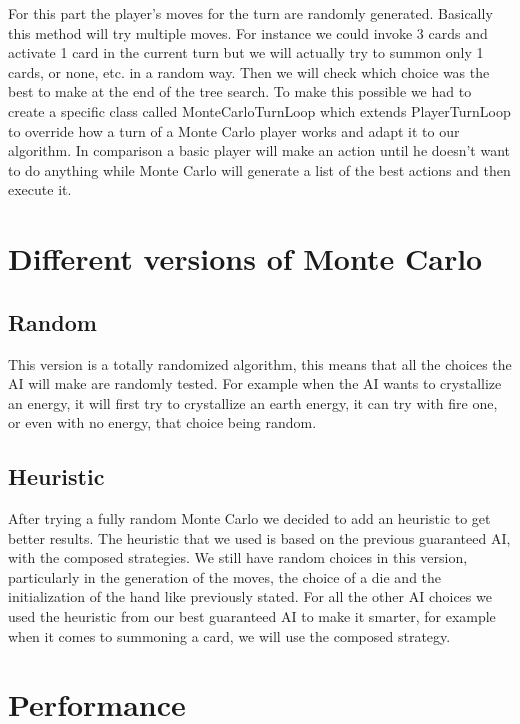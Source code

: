         For this part the player's moves for the turn are randomly generated. Basically this method will try multiple moves. For instance we could invoke 3 cards and activate 1 card in the current turn but we will actually try to summon only 1 cards, or none, etc. in a random way. Then we will check which choice was the best to make at the end of the tree search.
        To make this possible we had to create a specific class called MonteCarloTurnLoop which extends PlayerTurnLoop to override how a turn of a Monte Carlo player works and adapt it to our algorithm. In comparison a basic player will make an action until he doesn't want to do anything while Monte Carlo will generate a list of the best actions and then execute it.
        \newpage
        \section{Different versions of Monte Carlo}
        
        \subsection{Random}
        
        This version is a totally randomized algorithm, this means that all the choices the AI will make are randomly tested. For example when the AI wants to crystallize an energy, it will first try to crystallize an earth energy, it can try with fire one, or even with no energy, that choice being random.
        
        \subsection{Heuristic}
        
        After trying a fully random Monte Carlo we decided to add an heuristic to get better results. The heuristic that we used is based on the previous guaranteed AI, with the composed strategies. We still have random choices in this version, particularly in the generation of the moves, the choice of a die and the initialization of the hand like previously stated. For all the other AI choices we used the heuristic from our best guaranteed AI to make it smarter, for example when it comes to summoning a card, we will use the composed strategy.
        
        \section{Performance}
        
